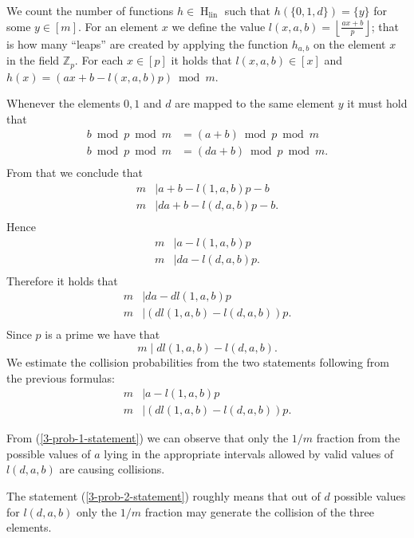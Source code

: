 \documentclass{article}
\newcommand{\hlin}{\operatorname{H}_{\operatorname{lin}}}
\begin{document}
We count the number of functions $h \in \hlin$ such that $h(\{0, 1, d\}) = \{y\}$ for some $y \in [m]$.
For an element $x$ we define the value $l(x, a, b) = \left\lfloor\frac{ax + b}{p}\right\rfloor$; that is how many ``leaps'' are created by applying the function $h_{a, b}$ on the element $x$ in the field $\mathbb{Z}_p$.
For each $x \in [p]$ it holds that $l(x, a, b) \in [x]$ and $h(x) = (ax + b - l(x, a, b)p) \bmod m$.

Whenever the elements $0, 1$ and $d$ are mapped to the same element $y$ it must hold that 
\begin{align*}
	b \bmod p \bmod m & = (a + b) \bmod p \bmod m \\
	b \bmod p \bmod m & = (da + b) \bmod p \bmod m. \\
\end{align*}
From that we conclude that
\begin{align*}
	m & \mid a + b - l(1, a, b)p - b \\
	m & \mid da + b - l(d, a, b)p - b. \\
\end{align*}
Hence
\begin{align*}
	m & \mid a - l(1, a, b)p \\
	m & \mid da - l(d, a, b)p. \\
\end{align*}
Therefore it holds that 
\begin{align*}
	m & \mid da - dl(1, a, b)p \\
	m & \mid (dl(1, a, b) - l(d, a, b))p. \\
\end{align*}
Since $p$ is a prime we have that \[m \mid dl(1, a, b) - l(d, a, b).\]
We estimate the collision probabilities from the two statements following from the previous formulas:
\begin{align}
	m & \mid a - l(1, a, b)p \label{3-prob-1-statement} \\
	m & \mid (dl(1, a, b) - l(d, a, b))p. \label{3-prob-2-statement}
\end{align}

From (\ref{3-prob-1-statement}) we can observe that only the $1 / m$ fraction from the possible values of $a$ lying in the appropriate intervals allowed by valid values of $l(d, a, b)$ are causing collisions.

The statement (\ref{3-prob-2-statement}) roughly means that out of $d$ possible values for $l(d, a, b)$ only the $1 / m$ fraction may generate the collision of the three elements.
\end{document}
